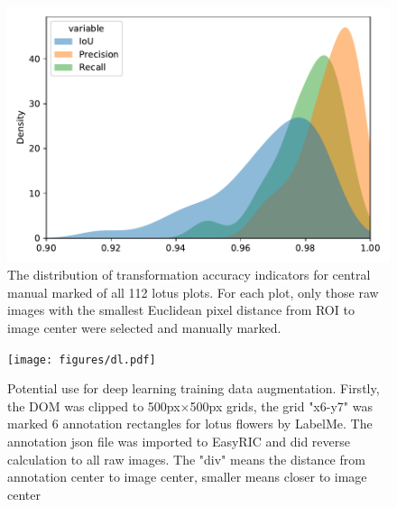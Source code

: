\documentclass[doublespacing]{configs/bmcart}
\begin{document}
\begin{backmatter}
\begin{figure}[!htb]
  \includegraphics[width=0.95\linewidth]{figures/iou_all.pdf}
  \caption{The distribution of transformation accuracy indicators for central manual marked of all 112 lotus plots. For each plot, only those raw images with the smallest Euclidean pixel distance from ROI to image center were selected and manually marked.}
  \label{fig:iou_all}
\end{figure}

\begin{figure}[!htb]
  \texttt{[image: figures/dl.pdf]}
  \caption{Potential use for deep learning training data augmentation. Firstly, the DOM was clipped to 500px$\times$500px grids, the grid "x6-y7" was marked 6 annotation rectangles for lotus flowers by LabelMe. The annotation json file was imported to EasyRIC and did reverse calculation to all raw images. The "div" means the distance from annotation center to image center, smaller means closer to image center}
  \label{fig:dl}
\end{figure}

\end{backmatter}
\end{document}
